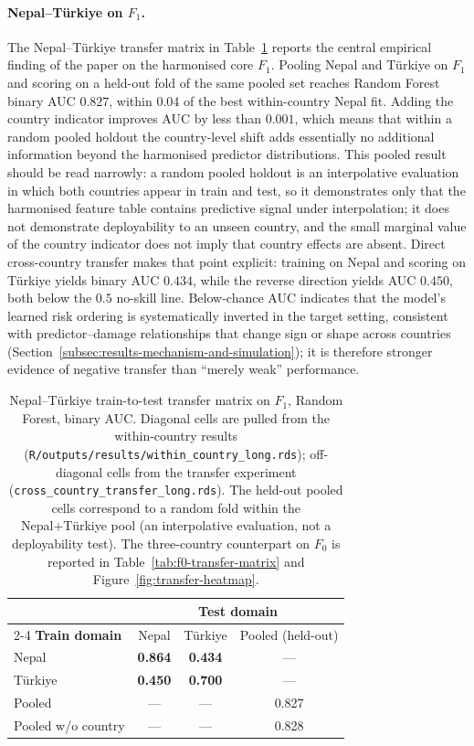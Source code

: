 \documentclass[11pt,a4paper]{article}
\begin{document}
\paragraph{Nepal--T\"urkiye on $F_1$.} The Nepal--T\"urkiye transfer matrix in Table~\ref{tab:transfer-matrix} reports the central empirical finding of the paper on the harmonised core $F_1$. Pooling Nepal and T\"urkiye on $F_1$ and scoring on a held-out fold of the same pooled set reaches Random Forest binary AUC $0.827$, within $0.04$ of the best within-country Nepal fit. Adding the country indicator improves AUC by less than $0.001$, which means that within a random pooled holdout the country-level shift adds essentially no additional information beyond the harmonised predictor distributions. This pooled result should be read narrowly: a random pooled holdout is an interpolative evaluation in which both countries appear in train and test, so it demonstrates only that the harmonised feature table contains predictive signal under interpolation; it does not demonstrate deployability to an unseen country, and the small marginal value of the country indicator does not imply that country effects are absent. Direct cross-country transfer makes that point explicit: training on Nepal and scoring on T\"urkiye yields binary AUC $0.434$, while the reverse direction yields AUC $0.450$, both below the $0.5$ no-skill line. Below-chance AUC indicates that the model's learned risk ordering is systematically inverted in the target setting, consistent with predictor--damage relationships that change sign or shape across countries (Section~\ref{subsec:results-mechanism-and-simulation}); it is therefore stronger evidence of negative transfer than ``merely weak'' performance.

\begin{table}[!t]
\centering
\caption{Nepal--T\"urkiye train-to-test transfer matrix on $F_1$, Random Forest, binary AUC. Diagonal cells are pulled from the within-country results (\texttt{R/outputs/results/within\_country\_long.rds}); off-diagonal cells from the transfer experiment (\texttt{cross\_country\_transfer\_long.rds}). The held-out pooled cells correspond to a random fold within the Nepal+T\"urkiye pool (an interpolative evaluation, not a deployability test). The three-country counterpart on $F_0$ is reported in Table~\ref{tab:f0-transfer-matrix} and Figure~\ref{fig:transfer-heatmap}.}
\label{tab:transfer-matrix}
\small
\begin{tabular}{l ccc}
\toprule
& \multicolumn{3}{c}{\textbf{Test domain}} \\
\cmidrule(lr){2-4}
\textbf{Train domain} & Nepal & T\"urkiye & Pooled (held-out) \\
\midrule
Nepal              & \textbf{0.864} & \textbf{0.434} & ---   \\
T\"urkiye          & \textbf{0.450} & \textbf{0.700} & ---   \\
Pooled             & ---            & ---            & 0.827 \\
Pooled w/o country & ---            & ---            & 0.828 \\
\bottomrule
\end{tabular}
\end{table}
\end{document}
